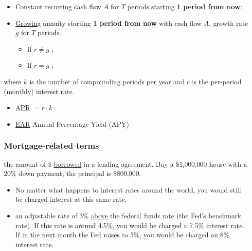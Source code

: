 \begin{itemize}
    \item \underline{Constant} recurring cash flow $A$ for $T$ periods starting \textbf{1 period from now}:
    \item \underline{Growing} annuity starting \textbf{1 period from now} with cash flow $A$, growth rate $g$ for $T$ periods.
        \begin{itemize}
            \item If $r \neq g$
                ;
            \item If $r = g$
                ;
        \end{itemize}
\end{itemize}

where $k$ is the number of compounding periods per year and $r$ is the per-period (\eg monthly) interest rate.
\begin{itemize}
    \item \underline{APR} $= r \cdot k$
    \item \underline{EAR} \ie Annual Percentage Yield (APY)
\end{itemize}

\subsubsection{Mortgage-related terms}

 the amount of \$ \underline{borrowed} in a lending agreement.
\Eg Buy a \$1,000,000 house with a 20\% down payment, the principal is \$800,000.

\begin{itemize}
    \item {} No matter what happens to interest rates around the world, you would still be charged
        interest at this same rate.
    \item {} \Eg an adjustable rate of 3\% \underline{above} the federal funds rate (the
        Fed's benchmark rate). If this rate is around 4.5\%, you would be charged a 7.5\% interest rate. If in the next
        month the Fed raises to 5\%, you would be charged an 8\% interest rate.
\end{itemize}

